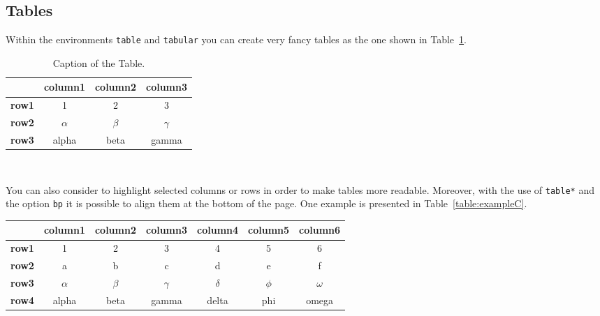 \documentclass[11pt,a4paper]{article}
\begin{document}
    \subsection{Tables} \label{subsec:tables}

        Within the environments \texttt{table} and  \texttt{tabular} you can create very fancy tables as the one shown in Table~\ref{table:example}.

        \begin{table}[H]
            \caption*{\textbf{Example of Table (optional)}}
            \centering 
            \begin{tabular}{|p{3em} c c c |}
            \hline
            \rowcolor{bluePoli!40}
            & \textbf{column1} & \textbf{column2} & \textbf{column3} \T\B \\
            \hline \hline
            \textbf{row1} & 1 & 2 & 3 \T\B \\
            \textbf{row2} & $\alpha$ & $\beta$ & $\gamma$ \T\B\\
            \textbf{row3} & alpha & beta & gamma \B\\
            \hline
            \end{tabular}
            \\[10pt]
            \caption{Caption of the Table.}
            \label{table:example}
        \end{table}

        You can also consider to highlight selected columns or rows in order to make tables more readable. Moreover, with the use of \texttt{table*} and the option \texttt{bp} it is possible to align them at the bottom of the page. One example is presented in Table~\ref{table:exampleC}. 

        \begin{table*}[bp]
        \centering 
            \begin{tabular}{|p{3em} | c | c | c | c | c | c|}
            \hline
            & \textbf{column1} & \textbf{column2} & \textbf{column3} & \textbf{column4} & \textbf{column5} & \textbf{column6} \T\B \\
            \hline \hline
            \textbf{row1} & 1 & 2 & 3 & 4 & 5 & 6 \T\B\\
            \textbf{row2} & a & b & c & d & e & f \T\B\\
            \textbf{row3} & $\alpha$ & $\beta$ & $\gamma$ & $\delta$ & $\phi$ & $\omega$ \T\B\\
            \textbf{row4} & alpha & beta & gamma & delta & phi & omega \B\\
            \hline
            \end{tabular}
            \\[10pt]
            \caption{Highlighting the columns}
            \label{table:exampleC}
        \end{table*}
\end{document}
